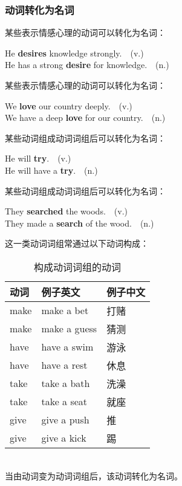 \documentclass[UTF8]{ctexart}
\begin{document}
\subsubsection{动词转化为名词}
    某些表示情感心理的动词可以转化为名词：
    \begin{center}
        \large\ttfamily
        He \textbf{desires} knowledge strongly.~~(v.)\\[3mm]
        He has a strong \textbf{desire} for knowledge.~~(n.)\\[6mm]
    \end{center}
    某些表示情感心理的动词可以转化为名词：
    \begin{center}
        \large\ttfamily
        We \textbf{love} our country deeply.~~(v.)\\[3mm]
        We have a deep \textbf{love} for our country.~~(n.)\\[6mm]
    \end{center}
    某些动词组成动词词组后可以转化为名词：
    \begin{center}
        \large\ttfamily
        He will \textbf{try}.~~(v.)\\[3mm]
        He will have a \textbf{try}.~~(n.)\\[6mm]
    \end{center}
    某些动词组成动词词组后可以转化为名词：
    \begin{center}
        \large\ttfamily
        They \textbf{searched} the woods.~~(v.)\\[3mm]
        They made a \textbf{search} of the wood.~~(n.)\\[6mm]
    \end{center}
    这一类动词词组常通过以下动词构成：\vspace{5pt}
    \begin{table}[h]
        \begin{center}
            \ttfamily
            \begin{tabular}{p{40pt}|p{80pt}|p{60pt}}
                \hline
                动词&例子英文&例子中文\\ \hline
                make&make a bet&打赌\\ \hline
                make&make a guess&猜测\\ \hline
                have&have a swim&游泳\\ \hline
                have&have a rest&休息\\ \hline
                take&take a bath&洗澡\\ \hline
                take&take a seat&就座\\ \hline
                give&give a push&推\\ \hline
                give&give a kick&踢\\ \hline
            \end{tabular}
            \rmfamily
            \caption{构成动词词组的动词}
        \end{center}
    \end{table}\\
    当由动词变为动词词组后，该动词转化为名词。
\end{document}
